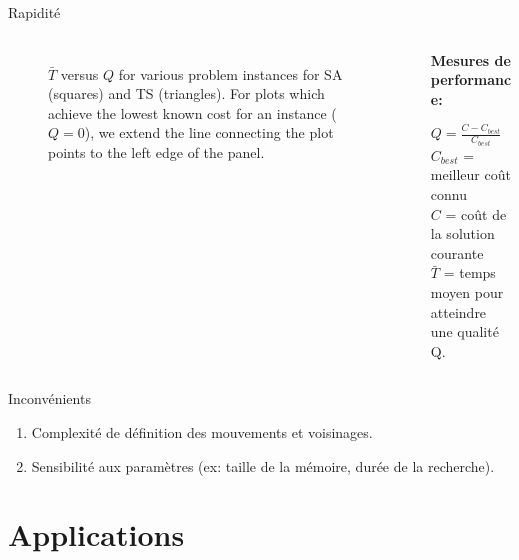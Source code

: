 \documentclass[10pt, handout]{beamer}
\begin{document}
\begin{frame}{Rapidité}
\begin{columns}
\begin{column}{0.6\textwidth}
\begin{figure}[ht]
\begin{center}
\begin{tabular}{cc}
                    \end{tabular}
                \end{center}
                \caption{$\bar T$ versus $Q$ for various problem instances for SA (squares) and TS (triangles).  For plots which
                    achieve the lowest known cost for an instance ($Q=0$), we extend the
                    line connecting the plot points to the left edge of the panel.}
                \label{pCRo}
            \end{figure}
        \end{column}
        \begin{column}{0.4\textwidth}

            \textbf{Mesures de performance:}
            \medskip

            $Q = \frac{C - C_{best}}{C_{best}}$ \\
            $C_{best}$ = meilleur coût connu \\
            $C$ = coût de la solution courante \\
            $\bar T$ = temps moyen pour atteindre une qualité Q.
        \end{column}
    \end{columns}
\end{frame}

\begin{frame}{Inconvénients}
    \begin{enumerate}
        \item Complexité de définition des mouvements et voisinages.
        \item Sensibilité aux paramètres (ex: taille de la mémoire, durée de la recherche).
    \end{enumerate}

\end{frame}

\section{Applications}
\end{document}
